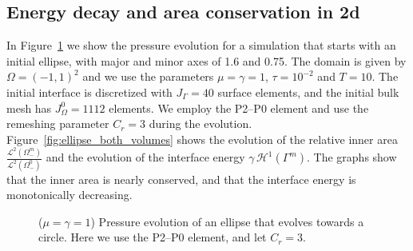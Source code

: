 \documentclass[a4paper,11pt,onecolumn]{article}
\begin{document}
\subsection{Energy decay and area conservation in 2d}
In Figure~\ref{fig:ellipse_both} we show the pressure evolution for a
simulation that starts with an initial ellipse, with major and minor axes of
1.6 and 0.75. The domain is given by $\Omega = (-1,1)^2$ and we use the
parameters $\mu = \gamma=1$, $\tau=10^{-2}$ and $T=10$. The initial interface
is discretized with $J_\Gamma = 40$ surface elements, and the initial bulk mesh
has $J_\Omega^0 = 1112$ elements. We employ the P2--P0 element and use the
remeshing parameter $C_r=3$ during the evolution.
Figure~\ref{fig:ellipse_both_volumes} shows the evolution of the relative inner
area $\frac{\mathcal{L}^2(\Omega^m_-)}{\mathcal{L}^2(\Omega^0_-)}$ and the
evolution of the interface energy $\gamma\,\mathcal{H}^{1}(\Gamma^m)$. The
graphs show that the inner area is nearly conserved, and that the interface
energy is monotonically decreasing.
\begin{figure}[htbp]
\centering
{}
\caption{($\mu=\gamma=1$) Pressure evolution of an ellipse that evolves
towards a circle. Here we use the P2--P0 element, and let $C_r = 3$.}
\label{fig:ellipse_both}
\end{figure}
\end{document}
